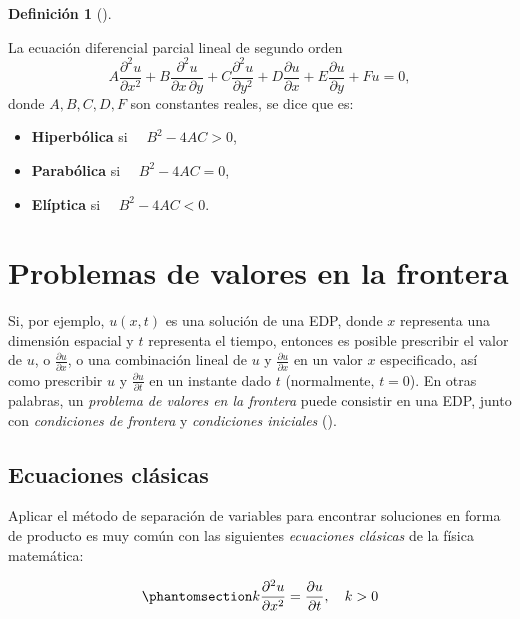 \documentclass[
  spanish,
  us-letterpaper,
]{scrreprt}
\providecommand{\tightlist}{%
  \setlength{\itemsep}{0pt}\setlength{\parskip}{0pt}}
\theoremstyle{definition}
\newtheorem{definition}{Definición}[chapter]
\theoremstyle{plain}
\theoremstyle{remark}
\begin{document}
\begin{definition}[]\protect\hypertarget{def-PDEs-classes}{}\label{def-PDEs-classes}

La ecuación diferencial parcial lineal de segundo orden \[
A \dfrac{\partial^2 u}{\partial x^2} + B \dfrac{\partial^2 u}{\partial x \, \partial y} + C \dfrac{\partial^2 u}{\partial y^2} + D \dfrac{\partial u}{\partial x} + E \dfrac{\partial u}{\partial y} + F u = 0,
\] donde \(A,B,C,D,F\) son constantes reales, se dice que es:

\begin{itemize}
\tightlist
\item
  \textbf{Hiperbólica} si \(\quad B^2-4AC>0\),
\item
  \textbf{Parabólica} si \(\quad B^2-4AC=0\),
\item
  \textbf{Elíptica} si \(\quad B^2-4AC<0\).
\end{itemize}

\end{definition}

\chapter{Problemas de valores en la
frontera}\label{problemas-de-valores-en-la-frontera}

Si, por ejemplo, \(u(x, t)\) es una solución de una EDP, donde \(x\)
representa una dimensión espacial y \(t\) representa el tiempo, entonces
es posible prescribir el valor de \(u\), o
\(\frac{\partial u}{\partial x}\), o una combinación lineal de \(u\) y
\(\frac{\partial u}{\partial x}\) en un valor \(x\) especificado, así
como prescribir \(u\) y \(\frac{\partial u}{\partial t}\) en un instante
dado \(t\) (normalmente, \(t=0\)). En otras palabras, un \emph{problema
de valores en la frontera} puede consistir en una EDP, junto con
\emph{condiciones de frontera} y \emph{condiciones iniciales}
().

\section{Ecuaciones clásicas}\label{ecuaciones-cluxe1sicas}

Aplicar el método de separación de variables para encontrar soluciones
en forma de producto es muy común con las siguientes \emph{ecuaciones
clásicas} de la física matemática:

\begin{equation}\phantomsection\label{eq-heat}{  
k\frac{\partial^2 u}{\partial x^2} = \frac{\partial u}{\partial t}, \quad k > 0  
}\end{equation}
\end{document}
